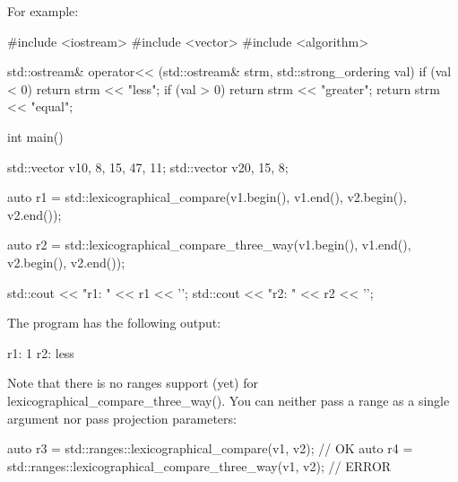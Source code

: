 For example:


\begin{cpp}
#include <iostream>
#include <vector>
#include <algorithm>

std::ostream& operator<< (std::ostream& strm, std::strong_ordering val)
{
	if (val < 0) return strm << "less";
	if (val > 0) return strm << "greater";
	return strm << "equal";
}

int main()
{
	std::vector v1{0, 8, 15, 47, 11};
	std::vector v2{0, 15, 8};
	
	auto r1 = std::lexicographical_compare(v1.begin(), v1.end(),
										   v2.begin(), v2.end());
										   
	auto r2 = std::lexicographical_compare_three_way(v1.begin(), v1.end(),
													 v2.begin(), v2.end());
													 
	std::cout << "r1: " << r1 << '\n';
	std::cout << "r2: " << r2 << '\n';
}
\end{cpp}

The program has the following output:

\begin{shell}
r1: 1
r2: less
\end{shell}

Note that there is no ranges support (yet) for lexicographical\_compare\_three\_way(). You can neither pass a range as a single argument nor pass projection parameters:

\begin{cpp}
auto r3 = std::ranges::lexicographical_compare(v1, v2); // OK
auto r4 = std::ranges::lexicographical_compare_three_way(v1, v2); // ERROR
\end{cpp}




